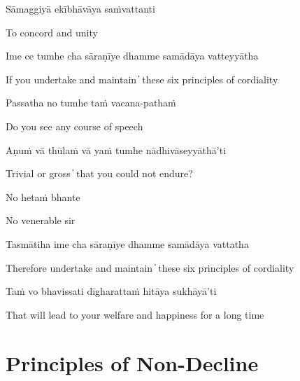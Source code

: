 Sāmaggiyā ekībhāvāya saṁvattanti

\begin{cprenglish}
  To concord and unity
\end{cprenglish}

\suttaRef{[MN 48]}

Ime ce tumhe cha sāraṇīye dhamme samādāya vatteyyātha

\begin{cprenglish}
  If you undertake and maintain  ̓  these six principles of cordiality
\end{cprenglish}

Passatha no tumhe taṁ vacana-pathaṁ

\begin{cprenglish}
  Do you see any course of speech
\end{cprenglish}

Aṇuṁ vā thūlaṁ vā yaṁ tumhe nādhivāseyyāthā’ti

\begin{cprenglish}
  Trivial or gross  ̓  that you could not endure?
\end{cprenglish}

No hetaṁ bhante

\begin{cprenglish}
  No venerable sir
\end{cprenglish}

Tasmātiha ime cha sāraṇīye dhamme samādāya vattatha

\begin{cprenglish}
  Therefore undertake and maintain  ̓  these six principles of cordiality
\end{cprenglish}

Taṁ vo bhavissati dīgharattaṁ hitāya sukhāyā’ti

\begin{cprenglish}
  That will lead to your welfare and happiness for a long time
\end{cprenglish}

\suttaRef{[MN 104]}

\clearpage

\section{Principles of Non-Decline}

\begin{leader}
\end{leader}

